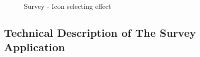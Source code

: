 \begin{figure}[H]
{      }
      \caption{Survey - Icon selecting effect}
    \end{figure}

\subsection{Technical Description of The Survey Application}


